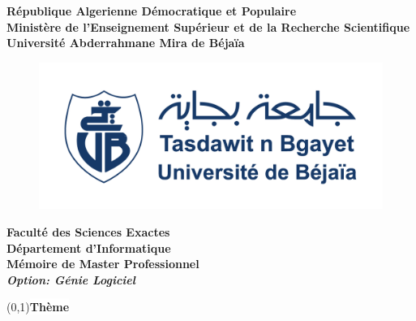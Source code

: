 
%
%
%
%
%

\begin{titlepage}




\begin{center}
	\textbf{ République Algerienne Démocratique et Populaire}\\\medskip
	\textbf{Ministère de l'Enseignement Supérieur et de la Recherche Scientifique}\\\medskip 
	\textbf{{\large Université Abderrahmane Mira de Béjaïa}}
	
	\begin{figure}[H]
	\centering
	\includegraphics[width=0.4\linewidth]{pagedegarde/Logo_Univ_Bejaia}
	\label{fig:Logo_Univ_Bejaia}
	\end{figure}
	\textbf{Faculté des Sciences Exactes}\\\bigskip
	\textbf{ Département d'Informatique}\\\bigskip
	\textbf{{\large Mémoire de Master Professionnel}}\\\bigskip
	\textbf{\textit{{\large Option: Génie Logiciel}}}
\end{center}
\vspace{1.2cm}



\boxput*(0,1){\colorbox{white}{\textbf{{\large Thème}}}}
{\setlength{\fboxsep}{25pt}
}


\end{titlepage}
